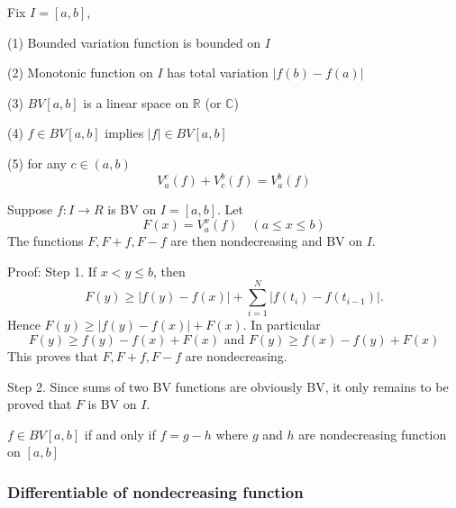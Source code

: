 \documentclass[12pt, a4paper, oneside]{book}
\begin{document}
\begin{proposition}
    Fix $I=[a,b]$,

    (1) Bounded variation function is bounded on $I$

    (2) Monotonic function on $I$ has total variation $\left|f(b) - f(a)\right|$

    (3) $BV[a,b]$ is a linear space on $\mathbb{R}$
    (or $\mathbb{C}$)

    (4) $f \in BV[a,b]$ implies $\left|f\right| \in BV[a,b]$

    (5) for any $c \in \left(a,b\right)$
    \begin{equation*}
        V_a^c \left(f\right)
        +
        V_c^b \left(f\right)
        =
        V_a^b \left(f\right)
    \end{equation*}
\end{proposition}

\begin{theorem}
    Suppose $f: I \rightarrow R$ is BV on $I=[a, b]$. Let
    \begin{equation*}
        F(x)
        =
        V_a^x \left(f\right)\quad(a \leq x \leq b)
    \end{equation*}
    The functions $F, F+f, F-f$ are then nondecreasing and BV on $I$.

    Proof:
    Step 1. If $x<y \leq b$, then
    \begin{equation*}
        F(y) \geq|f(y)-f(x)|+\sum_{i=1}^N\left|f\left(t_i\right)-f\left(t_{i-1}\right)\right| .
    \end{equation*}
    Hence $F(y) \geq|f(y)-f(x)|+F(x)$. In particular
    \begin{equation*}
        F(y) \geq f(y)-f(x)+F(x) \text { and } F(y) \geq f(x)-f(y)+F(x)
    \end{equation*}
    This proves that $F, F+f, F-f$ are nondecreasing.

    Step 2. Since sums of two BV functions are obviously BV, it only remains to be proved that $F$ is BV on $I$.
\end{theorem}

\begin{theorem}
    $f \in BV[a,b]$ if and only if $f =g-h $ where $g$ and $h$ are nondecreasing function on $[a,b]$
\end{theorem}



\subsubsection{Differentiable of nondecreasing function}
\end{document}
